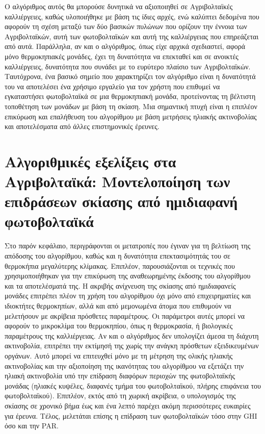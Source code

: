 \documentclass[12pt, a4paper]{report} %
\newcommand{\english}{\foreignlanguage{english}}
\begin{document}
Ο αλγόριθμος αυτός θα μπορούσε δυνητικά να αξιοποιηθεί σε Αγριβολταϊκές καλλιέργειες, καθώς υλοποιήθηκε με βάση τις 
ίδιες αρχές, ενώ καλύπτει δεδομένα που αφορούν τη σχέση μεταξύ των δύο βασικών πυλώνων που ορίζουν την έννοια των 
Αγριβολταϊκών, αυτή των φωτοβολταϊκών και αυτή της καλλιέργειας που επηρεάζεται από αυτά. Παράλληλα, αν και ο αλγόριθμος, 
όπως είχε αρχικά σχεδιαστεί, αφορά μόνο θερμοκηπιακές μονάδες, έχει τη δυνατότητα να επεκταθεί και σε ανοικτές 
καλλιέργειες, δυνατότητα που συνάδει με το ευρύτερο πλαίσιο των Αγριβολταϊκών. Ταυτόχρονα, ένα βασικό σημείο που 
χαρακτηρίζει τον αλγόριθμο είναι η δυνατότητά του να αποτελέσει ένα χρήσιμο εργαλείο για τον χρήστη που επιθυμεί 
να εγκαταστήσει φωτοβολταϊκά σε μια θερμοκηπιακή μονάδα, προτείνοντας τη βέλτιστη τοποθέτηση των μονάδων με βάση τη 
σκίαση. Μια σημαντική πτυχή είναι η επιπλέον επικύρωση και επαλήθευση του αλγορίθμου με βάση μετρήσεις ηλιακής 
ακτινοβολίας και αποτελέσματα από άλλες επιστημονικές έρευνες. 

\newpage
\vspace*{6.5cm}
\sloppy
\section{Αλγοριθμικές εξελίξεις στα Αγριβολταϊκά: Μοντελοποίηση των επιδράσεων σκίασης από ημιδιαφανή φωτοβολταϊκά}
\label{sec_alg_advanc}
\fussy

Στο παρόν κεφάλαιο, περιγράφονται οι μετατροπές που έγιναν για τη βελτίωση της απόδοσης του αλγορίθμου, καθώς και η δυνατότητα 
επεκτασιμότητάς του σε θερμοκήπια μεγαλύτερης κλίμακας. Επιπλέον, παρουσιάζονται οι τεχνικές που χρησιμοποιήθηκαν για την 
επικύρωση της αναθεωρημένης έκδοσης του αλγορίθμου και τα αποτελέσματά της. Η ακριβής ανίχνευση της σκίασης από ημιδιαφανείς μονάδες 
επιτρέπει πλέον τη χρήση του αλγορίθμου όχι μόνο από επιχειρηματίες και ιδιοκτήτες θερμοκηπίων, αλλά και από μεμονωμένα άτομα 
που επιθυμούν να μελετήσουν με ακρίβεια πρόσθετες παραμέτρους. Οι παράμετροι αυτές μπορεί να αφορούν το μικροκλίμα του θερμοκηπίου, 
όπως η θερμοκρασία, ή βιολογικές παραμέτρους της καλλιέργειας. Αν και ο αλγόριθμος δεν υπολογίζει άμεσα τη διάχυτη ακτινοβολία, 
επιτρέπει την εκτίμησή της χωρίς την ανάγκη πρόσθετων εξειδικευμένων οργάνων. Αυτό μπορεί να επιτευχθεί μόνο με τη μέτρηση της 
ολικής ηλιακής ακτινοβολίας και την αξιοποίηση της ικανότητας του αλγορίθμου να εξετάζει την ηλιακή ακτινοβολία υπό την επίδραση 
διαφόρων περιοχών της φωτοβολταϊκής μονάδας (ηλιακές κυψέλες, διαφανές τμήμα του φωτοβολταϊκού, πλήρης επιφάνεια του φωτοβολταϊκού). 
Επιπλέον, εκτός από τη χωρική ακρίβεια, ο υπολογισμός της σκίασης σε χρονικό βήμα έως και ένα λεπτό παρέχει ακόμη περισσότερες 
ευκαιρίες για έρευνα. Τέλος, μελετάται επίσης η επίδραση των φωτοβολταϊκών τόσο στην \english{GHI} όσο και την \english{PAR}.
\end{document}
